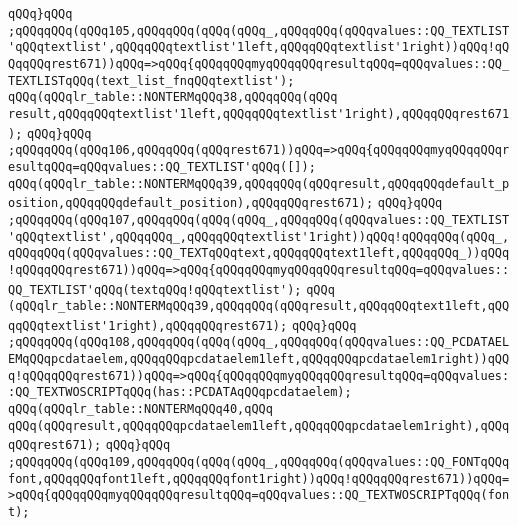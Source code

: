 \verb|qQQq}qQQq|\newline
\verb|;qQQqqQQq(qQQq105,qQQqqQQq(qQQq(qQQq_,qQQqqQQq(qQQqvalues::QQ_TEXTLIST'qQQqtextlist',qQQqqQQqtextlist'1left,qQQqqQQqtextlist'1right))qQQq!qQQqqQQqrest671))qQQq=>qQQq{qQQqqQQqmyqQQqqQQqresultqQQq=qQQqvalues::QQ_TEXTLISTqQQq(text_list_fnqQQqtextlist');|\newline
\verb|qQQq(qQQqlr_table::NONTERMqQQq38,qQQqqQQq(qQQq|\newline
\verb|result,qQQqqQQqtextlist'1left,qQQqqQQqtextlist'1right),qQQqqQQqrest671);|\newline
\verb|qQQq}qQQq|\newline
\verb|;qQQqqQQq(qQQq106,qQQqqQQq(qQQqrest671))qQQq=>qQQq{qQQqqQQqmyqQQqqQQqresultqQQq=qQQqvalues::QQ_TEXTLIST'qQQq([]);|\newline
\verb|qQQq(qQQqlr_table::NONTERMqQQq39,qQQqqQQq(qQQqresult,qQQqqQQqdefault_position,qQQqqQQqdefault_position),qQQqqQQqrest671);|\newline
\verb|qQQq}qQQq|\newline
\verb|;qQQqqQQq(qQQq107,qQQqqQQq(qQQq(qQQq_,qQQqqQQq(qQQqvalues::QQ_TEXTLIST'qQQqtextlist',qQQqqQQq_,qQQqqQQqtextlist'1right))qQQq!qQQqqQQq(qQQq_,qQQqqQQq(qQQqvalues::QQ_TEXTqQQqtext,qQQqqQQqtext1left,qQQqqQQq_))qQQq!qQQqqQQqrest671))qQQq=>qQQq{qQQqqQQqmyqQQqqQQqresultqQQq=qQQqvalues::QQ_TEXTLIST'qQQq(textqQQq!qQQqtextlist');|\newline
\verb|qQQq|\newline
\verb|(qQQqlr_table::NONTERMqQQq39,qQQqqQQq(qQQqresult,qQQqqQQqtext1left,qQQqqQQqtextlist'1right),qQQqqQQqrest671);|\newline
\verb|qQQq}qQQq|\newline
\verb|;qQQqqQQq(qQQq108,qQQqqQQq(qQQq(qQQq_,qQQqqQQq(qQQqvalues::QQ_PCDATAELEMqQQqpcdataelem,qQQqqQQqpcdataelem1left,qQQqqQQqpcdataelem1right))qQQq!qQQqqQQqrest671))qQQq=>qQQq{qQQqqQQqmyqQQqqQQqresultqQQq=qQQqvalues::QQ_TEXTWOSCRIPTqQQq(has::PCDATAqQQqpcdataelem);|\newline
\verb|qQQq(qQQqlr_table::NONTERMqQQq40,qQQq|\newline
\verb|qQQq(qQQqresult,qQQqqQQqpcdataelem1left,qQQqqQQqpcdataelem1right),qQQqqQQqrest671);|\newline
\verb|qQQq}qQQq|\newline
\verb|;qQQqqQQq(qQQq109,qQQqqQQq(qQQq(qQQq_,qQQqqQQq(qQQqvalues::QQ_FONTqQQqfont,qQQqqQQqfont1left,qQQqqQQqfont1right))qQQq!qQQqqQQqrest671))qQQq=>qQQq{qQQqqQQqmyqQQqqQQqresultqQQq=qQQqvalues::QQ_TEXTWOSCRIPTqQQq(font);|\newline
